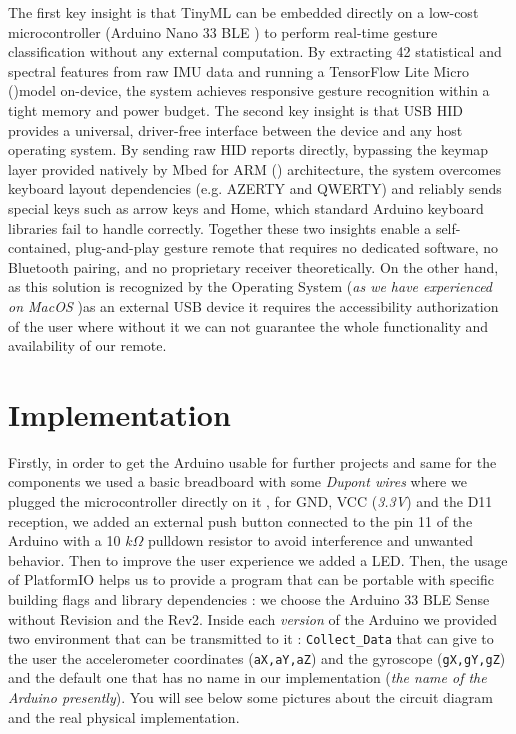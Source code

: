 \documentclass[sigconf,10pt,nonacm]{acmart}
\begin{document}
The first key insight is that TinyML  can be embedded directly on a low-cost microcontroller (Arduino Nano 33 BLE \cite{arduino_nano}) to perform real-time gesture classification without any external computation. By extracting 42 statistical and spectral features from raw IMU data and running a TensorFlow Lite Micro (\cite{tensorflow_lite})model on-device, the system achieves responsive gesture recognition within a tight memory and power budget.
The second key insight is that USB HID provides a universal, driver-free interface between the device and any host operating system. By sending raw HID reports directly, bypassing the keymap layer provided natively by Mbed for ARM (\cite{mbed}) architecture, the system overcomes keyboard layout dependencies (e.g. AZERTY and QWERTY) and reliably sends special keys such as arrow keys and Home, which standard Arduino keyboard libraries fail to handle correctly.
Together these two insights enable a self-contained, plug-and-play gesture remote that requires no dedicated software, no Bluetooth pairing, and no proprietary receiver theoretically. On the other hand, as this solution is recognized by the Operating System (\textit{as we have experienced on MacOS} )as an external USB device it requires the accessibility authorization of the user where without it we can not guarantee the whole functionality and availability of our remote.   




\section{Implementation}
\label{sec:implementation}
Firstly, in order to get the Arduino usable for further projects and same for the components we used a basic breadboard with some \textit{Dupont wires} where we plugged the microcontroller directly on it , for GND, VCC (\textit{3.3V}) and the D11 reception, we added an external push button connected to the pin 11 of the Arduino with a 10 $k \Omega$  pulldown resistor to avoid  interference and unwanted behavior.  Then to improve the user experience we added a LED. 
Then, the usage of PlatformIO \cite{platformio} helps us to provide a program that can be portable with specific building flags and library dependencies : we choose the Arduino 33 BLE Sense without Revision and the Rev2. Inside each \textit{version} of the Arduino we provided two environment  that can be transmitted to it : \texttt{Collect\_Data} that can give to the user the accelerometer coordinates (\texttt{aX,aY,aZ}) and the gyroscope (\texttt{gX,gY,gZ})  and the default one that has no name in our implementation (\textit{the name of the Arduino presently}). \newline 
You will see below some pictures about the circuit diagram and the real physical implementation. 
\end{document}
